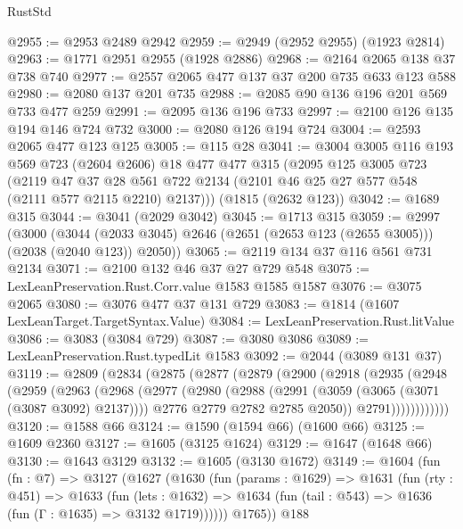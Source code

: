 \begin{lexlean}{RustStd}
\begin{coremodule}
{\begin{coremodule}
{{{{{{{{{{{{{{@2955 := @2953 @2489 @2942
@2959 := @2949 (@2952 @2955) (@1923 @2814)
@2963 := @1771 @2951 @2955 (@1928 @2886)
@2968 := @2164 @2065 @138 @37 @738 @740
@2977 := @2557 @2065 @477 @137 @37 @200 @735 @633 @123 @588
@2980 := @2080 @137 @201 @735
@2988 := @2085 @90 @136 @196 @201 @569 @733 @477 @259
@2991 := @2095 @136 @196 @733
@2997 := @2100 @126 @135 @194 @146 @724 @732
@3000 := @2080 @126 @194 @724
@3004 := @2593 @2065 @477 @123 @125
@3005 := @115 @28
@3041 := @3004
    @3005
    @116
    @193
    @569
    @723
    (@2604 @2606)
    @18
    @477
    @477
    @315
    (@2095
      @125
      @3005
      @723
      (@2119
        @47
        @37
        @28
        @561
        @722
        @2134
        (@2101 @46 @25 @27 @577 @548 (@2111 @577 @2115 @2210) @2137)))
    (@1815 (@2632 @123))
@3042 := @1689 @315
@3044 := @3041 (@2029 @3042)
@3045 := @1713 @315
@3059 := @2997
    (@3000
      (@3044 (@2033 @3045) @2646 (@2651 (@2653 @123 (@2655 @3005))) (@2038 (@2040 @123)) @2050))
@3065 := @2119 @134 @37 @116 @561 @731 @2134
@3071 := @2100 @132 @46 @37 @27 @729 @548
@3075 := LexLeanPreservation.Rust.Corr.value @1583 @1585 @1587
@3076 := @3075 @2065
@3080 := @3076 @477 @37 @131 @729
@3083 := @1814 (@1607 LexLeanTarget.TargetSyntax.Value)
@3084 := LexLeanPreservation.Rust.litValue
@3086 := @3083 (@3084 @729)
@3087 := @3080 @3086
@3089 := LexLeanPreservation.Rust.typedLit @1583
@3092 := @2044 (@3089 @131 @37)
@3119 := @2809
    (@2834
      (@2875
        (@2877
          (@2879
            (@2900
              (@2918
                (@2935
                  (@2948
                    (@2959
                      (@2963
                        (@2968
                          (@2977
                            (@2980
                              (@2988
                                (@2991 (@3059 (@3065 (@3071 (@3087 @3092) @2137))))
                                @2776
                                @2779
                                @2782
                                @2785
                                @2050))
                            @2791))))))))))))
@3120 := @1588 @66
@3124 := @1590 (@1594 @66) (@1600 @66)
@3125 := @1609 @2360
@3127 := @1605 (@3125 @1624)
@3129 := @1647 (@1648 @66)
@3130 := @1643 @3129
@3132 := @1605 (@3130 @1672)
@3149 := @1604
    (fun (fn : @7) =>
    @3127
      (@1627
        (@1630
          (fun (params : @1629) =>
          @1631
            (fun (rty : @451) =>
            @1633
              (fun (lets : @1632) =>
              @1634 (fun (tail : @543) => @1636 (fun (Γ : @1635) => @3132 @1719))))))
        @1765))
    @188
}}}}}}}}}}}}}}
\end{coremodule}}
\end{coremodule}
\end{lexlean}
